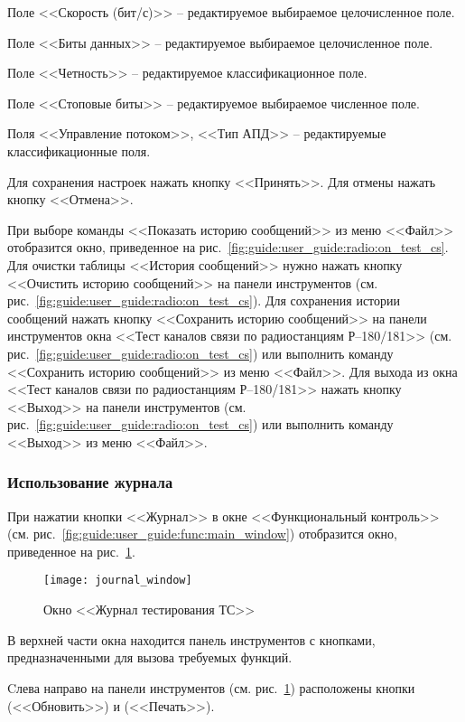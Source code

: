 Поле <<Скорость (бит/с)>> -- редактируемое выбираемое целочисленное поле.

Поле <<Биты данных>> -- редактируемое выбираемое целочисленное поле.

Поле <<Четность>> -- редактируемое классификационное поле.

Поле <<Стоповые биты>> -- редактируемое выбираемое численное поле.

Поля <<Управление потоком>>, <<Тип АПД>> -- редактируемые классификационные поля.

Для сохранения настроек нажать кнопку <<Принять>>. Для отмены нажать кнопку <<Отмена>>.

При выборе команды <<Показать историю сообщений>> из меню <<Файл>> отобразится окно, приведенное на
рис.~\ref{fig:guide:user_guide:radio:on_test_cs}.
Для очистки таблицы <<История сообщений>> нужно нажать кнопку <<Очистить историю сообщений>> на панели инструментов (см.
рис.~\ref{fig:guide:user_guide:radio:on_test_cs}).
Для сохранения истории сообщений нажать кнопку <<Сохранить историю сообщений>> на панели инструментов окна <<Тест
каналов связи по радиостанциям Р–180/181>> (см. рис.~\ref{fig:guide:user_guide:radio:on_test_cs})  или выполнить команду
<<Сохранить историю сообщений>> из меню <<Файл>>.
Для выхода из окна <<Тест каналов связи по радиостанциям Р–180/181>> нажать кнопку <<Выход>> на панели инструментов (см.
рис.~\ref{fig:guide:user_guide:radio:on_test_cs}) или выполнить команду <<Выход>> из меню <<Файл>>.

\subsubsection{Использование журнала}
\label{sub:guide:user_guide:journal}
При нажатии кнопки <<Журнал>> в окне <<Функциональный контроль>>
(см. рис.~\ref{fig:guide:user_guide:func:main_window}) отобразится окно, приведенное на
рис.~\ref{fig:guide:user_guide:journal:journal_window}.

\begin{figure}[htb]
	\centering
	\texttt{[image: journal\_window]}
	\caption{Окно <<Журнал тестирования ТС>>}
	\label{fig:guide:user_guide:journal:journal_window}
\end{figure}

В верхней части окна находится панель инструментов с кнопками, предназначенными для вызова требуемых функций.

Cлева направо на панели инструментов (см. рис.~\ref{fig:guide:user_guide:journal:journal_window}) расположены кнопки
(<<Обновить>>) и (<<Печать>>).

